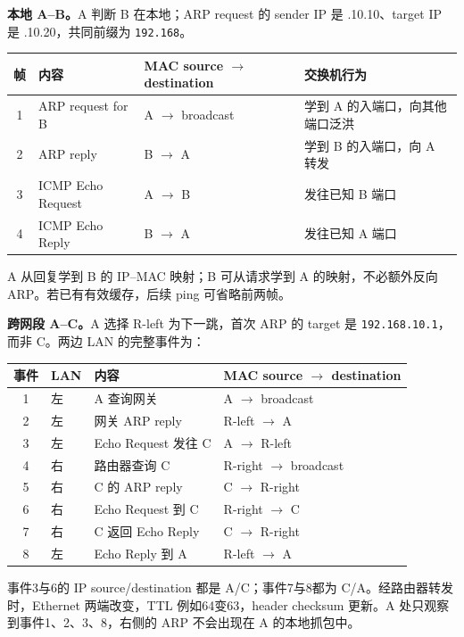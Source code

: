 \begin{workedsolution}
\textbf{本地 A--B。}A 判断 B 在本地；ARP request 的 sender IP 是 .10.10、target IP 是 .10.20，共同前缀为 \texttt{192.168}。
\begin{center}
\small
\begin{tabularx}{\textwidth}{@{}cllX@{}}
\toprule
帧 & 内容 & MAC source $\to$ destination & 交换机行为 \\
\midrule
1 & ARP request for B & A $\to$ broadcast & 学到 A 的入端口，向其他端口泛洪 \\
2 & ARP reply & B $\to$ A & 学到 B 的入端口，向 A 转发 \\
3 & ICMP Echo Request & A $\to$ B & 发往已知 B 端口 \\
4 & ICMP Echo Reply & B $\to$ A & 发往已知 A 端口 \\
\bottomrule
\end{tabularx}
\end{center}
A 从回复学到 B 的 IP--MAC 映射；B 可从请求学到 A 的映射，不必额外反向 ARP。若已有有效缓存，后续 ping 可省略前两帧。

\textbf{跨网段 A--C。}A 选择 R-left 为下一跳，首次 ARP 的 target 是 \texttt{192.168.10.1}，而非 C。两边 LAN 的完整事件为：
\begin{center}
\small
\begin{tabular}{@{}clll@{}}
\toprule
事件 & LAN & 内容 & MAC source $\to$ destination \\
\midrule
1 & 左 & A 查询网关 & A $\to$ broadcast \\
2 & 左 & 网关 ARP reply & R-left $\to$ A \\
3 & 左 & Echo Request 发往 C & A $\to$ R-left \\
4 & 右 & 路由器查询 C & R-right $\to$ broadcast \\
5 & 右 & C 的 ARP reply & C $\to$ R-right \\
6 & 右 & Echo Request 到 C & R-right $\to$ C \\
7 & 右 & C 返回 Echo Reply & C $\to$ R-right \\
8 & 左 & Echo Reply 到 A & R-left $\to$ A \\
\bottomrule
\end{tabular}
\end{center}
事件3与6的 IP source/destination 都是 A/C；事件7与8都为 C/A。经路由器转发时，Ethernet 两端改变，TTL 例如64变63，header checksum 更新。A 处只观察到事件1、2、3、8，右侧的 ARP 不会出现在 A 的本地抓包中。
\end{workedsolution}

